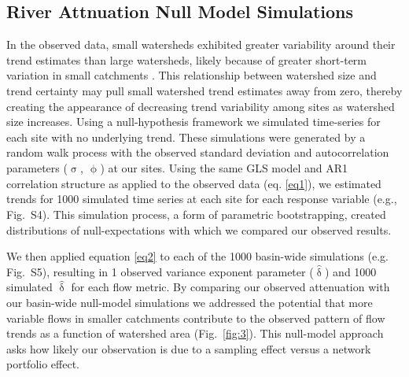 \documentclass[9pt,twocolumn,twoside,lineno]{pnas-new}
\begin{document}
{\subsection*{River Attnuation Null Model Simulations} In the observed data, small watersheds exhibited greater variability around their trend estimates than large watersheds, likely because of greater short-term variation in small catchments \cite{Moore:2015}. This relationship between watershed size and trend certainty may pull small watershed trend estimates away from zero, thereby creating the appearance of decreasing trend variability among sites as watershed size increases. Using a null-hypothesis framework we simulated time-series for each site with no underlying trend. These simulations were generated by a random walk process with the observed standard deviation and autocorrelation parameters ($\hat{\upsigma}$, $\hat{\upphi}$) at our sites. Using the same GLS model and AR1 correlation structure as applied to the observed data (eq. \ref{eq1}), we estimated trends for 1000 simulated time series at each site for each response variable (e.g., Fig.~S4). This simulation process, a form of parametric bootstrapping, created distributions of null-expectations with which we compared our observed results.

We then applied equation \ref{eq2} to each of the 1000 basin-wide simulations (e.g. Fig.~S5), resulting in 1 observed variance exponent parameter ($\hat{\updelta}$) and 1000 simulated $\hat{\updelta}$ for each flow metric. By comparing our observed attenuation with our basin-wide null-model simulations we addressed the potential that more variable flows in smaller catchments contribute to the observed pattern of flow trends as a function of watershed area (Fig.~\ref{fig:3}). This null-model approach asks how likely our observation is due to a sampling effect versus a network portfolio effect.

}
\end{document}

